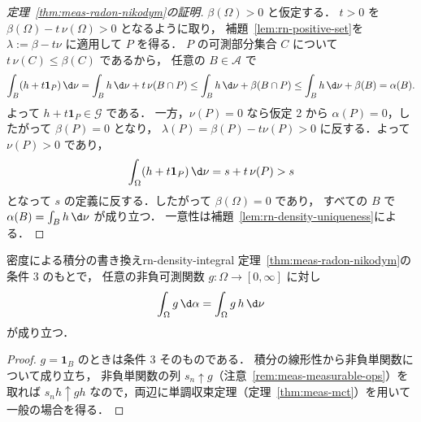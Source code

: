 \begin{proof}[定理~\ref{thm:meas-radon-nikodym}の証明]
  $\beta(\Omega)>0$ と仮定する．
  $t>0$ を $\beta(\Omega)-t\,\nu(\Omega)>0$ となるように取り，
  補題~\ref{lem:rn-positive-set}を $\lambda:=\beta-t\nu$ に適用して $P$ を得る．
  $P$ の可測部分集合 $C$ について $t\,\nu(C)\leq\beta(C)$ であるから，
  任意の $B\in\mathcal{A}$ で
  \[
    \int_B(h+t\mathbf{1}_P)\,\d\nu
    =\int_Bh\,\d\nu+t\,\nu(B\cap P)
    \leq\int_Bh\,\d\nu+\beta(B\cap P)
    \leq\int_Bh\,\d\nu+\beta(B)=\alpha(B).
  \]
  よって $h+t\mathbf{1}_P\in\mathcal{G}$ である．
  一方，$\nu(P)=0$ なら仮定 2 から $\alpha(P)=0$，したがって $\beta(P)=0$ となり，
  $\lambda(P)=\beta(P)-t\nu(P)>0$ に反する．よって $\nu(P)>0$ であり，
  \[
    \int_\Omega(h+t\mathbf{1}_P)\,\d\nu=s+t\,\nu(P)>s
  \]
  となって $s$ の定義に反する．したがって $\beta(\Omega)=0$ であり，
  すべての $B$ で $\alpha(B)=\int_Bh\,\d\nu$ が成り立つ．
  一意性は補題~\ref{lem:rn-density-uniqueness}による．
\end{proof}

\begin{corollary}{密度による積分の書き換え}{rn-density-integral}
  定理~\ref{thm:meas-radon-nikodym}の条件 3 のもとで，
  任意の非負可測関数 $g\colon\Omega\to[0,\infty]$ に対し
  \[
    \int_\Omega g\,\d\alpha=\int_\Omega g\,h\,\d\nu
  \]
  が成り立つ．
\end{corollary}

\begin{proof}
  $g=\mathbf{1}_B$ のときは条件 3 そのものである．
  積分の線形性から非負単関数について成り立ち，
  非負単関数の列 $s_n\uparrow g$（注意~\ref{rem:meas-measurable-ops}）を取れば
  $s_nh\uparrow gh$ なので，両辺に単調収束定理（定理~\ref{thm:meas-mct}）を用いて一般の場合を得る．
\end{proof}
